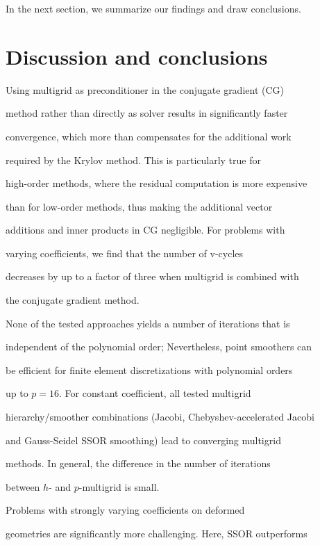 \documentclass[smallcondensed,final]{svjour3}     %
\begin{document}
In the next section, we summarize our findings and draw conclusions.



\section{Discussion and conclusions}

\label{sec:discuss}







Using multigrid as preconditioner in the conjugate gradient (CG)

method rather than directly as solver results in significantly faster

convergence, which more than compensates for the additional work

required by the Krylov method.  This is particularly true for

high-order methods, where the residual computation is more expensive

than for low-order methods, thus making the additional vector

additions and inner products in CG negligible.  For problems with

varying coefficients, we find that the number of v-cycles

decreases by up to a factor of three when multigrid is combined with

the conjugate gradient method.



None of the tested approaches yields a number of iterations that is

independent of the polynomial order; Nevertheless, point smoothers can

be efficient for finite element discretizations with polynomial orders

up to $p=16$.  For constant coefficient, all tested multigrid

hierarchy/smoother combinations (Jacobi, Chebyshev-accelerated Jacobi

and Gauss-Seidel SSOR smoothing) lead to converging multigrid

methods. In general, the difference in the number of iterations

between $h$- and $p$-multigrid is small.

Problems with strongly varying coefficients on deformed

geometries are significantly more challenging. Here, SSOR outperforms
\end{document}
